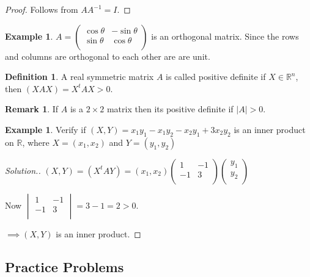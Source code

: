 \documentclass[11pt,a4paper]{article}
\theoremstyle{definition}
\newtheorem{defn}[thm]{Definition}
\newtheorem{exa}[thm]{Example}
\newtheorem*{remark}{Remark}
\newenvironment{solution}
  {\renewcommand{\qedsymbol}{}\begin{proof}[\textit{Solution}.]}
  {\end{proof}}
\begin{document}
\begin{proof}
Follows from $AA^{-1}=I$.
\end{proof}


\begin{exa}
$A=
\begin{pmatrix}
\cos{\theta}&-\sin{\theta}\\\sin{\theta}&\cos{\theta}\\
\end{pmatrix}
$
is an orthogonal matrix. Since the rows and columns are orthogonal to each other are are unit.
\end{exa}


\begin{defn}
A real symmetric matrix $A$ is called positive definite if $X\in \mathbb{R}^n$, then $(XAX)=X^tAX>0$.
\end{defn}


\begin{remark}
If $A$ is a $2\times 2$ matrix then its positive definite if $|A|>0$.
\end{remark}


\begin{exa}
Verify if $(X,Y)=x_1y_1-x_1y_2-x_2y_1+3x_2y_2$ is an inner product on $\mathbb{R}$, where $X=(x_1,x_2)$ and $Y=(y_1,y_2)$
\end{exa}


\begin{solution}
$(X,Y)=(X^tAY)=(x_1,x_2)
\begin{pmatrix}
1&-1\\-1&3\\
\end{pmatrix}
\begin{pmatrix}
y_1\\y_2\\
\end{pmatrix}
$

Now
$
\begin{vmatrix}
1&-1\\-1&3\\
\end{vmatrix}
=3-1=2>0$.

$\implies (X,Y)$ is an inner product.


\pagebreak
\end{solution}


 
\subsection{Practice Problems}
\end{document}
